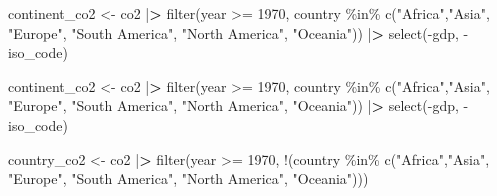 \documentclass[
]{article}
\newenvironment{Shaded}{\begin{snugshade}}{\end{snugshade}}
\newcommand{\DecValTok}[1]{\textcolor[rgb]{0.00,0.00,0.81}{#1}}
\newcommand{\ErrorTok}[1]{\textcolor[rgb]{0.64,0.00,0.00}{\textbf{#1}}}
\newcommand{\FunctionTok}[1]{\textcolor[rgb]{0.00,0.00,0.00}{#1}}
\newcommand{\NormalTok}[1]{#1}
\newcommand{\OtherTok}[1]{\textcolor[rgb]{0.56,0.35,0.01}{#1}}
\newcommand{\SpecialCharTok}[1]{\textcolor[rgb]{0.00,0.00,0.00}{#1}}
\newcommand{\StringTok}[1]{\textcolor[rgb]{0.31,0.60,0.02}{#1}}
\begin{document}
\begin{Shaded}
\begin{Highlighting}[]
\NormalTok{continent\_co2 }\OtherTok{\textless{}{-}}\NormalTok{ co2 }\SpecialCharTok{|}\ErrorTok{\textgreater{}}
  \FunctionTok{filter}\NormalTok{(year }\SpecialCharTok{\textgreater{}=} \DecValTok{1970}\NormalTok{, country }\SpecialCharTok{\%in\%} \FunctionTok{c}\NormalTok{(}\StringTok{"Africa"}\NormalTok{,}\StringTok{"Asia"}\NormalTok{, }\StringTok{"Europe"}\NormalTok{, }\StringTok{"South America"}\NormalTok{, }\StringTok{"North America"}\NormalTok{, }\StringTok{"Oceania"}\NormalTok{)) }\SpecialCharTok{|}\ErrorTok{\textgreater{}}
  \FunctionTok{select}\NormalTok{(}\SpecialCharTok{{-}}\NormalTok{gdp,}
         \SpecialCharTok{{-}}\NormalTok{iso\_code)}
\end{Highlighting}
\end{Shaded}

\begin{Shaded}
\begin{Highlighting}[]
\NormalTok{continent\_co2 }\OtherTok{\textless{}{-}}\NormalTok{ co2 }\SpecialCharTok{|}\ErrorTok{\textgreater{}}
  \FunctionTok{filter}\NormalTok{(year }\SpecialCharTok{\textgreater{}=} \DecValTok{1970}\NormalTok{, country }\SpecialCharTok{\%in\%} \FunctionTok{c}\NormalTok{(}\StringTok{"Africa"}\NormalTok{,}\StringTok{"Asia"}\NormalTok{, }\StringTok{"Europe"}\NormalTok{, }\StringTok{"South America"}\NormalTok{, }\StringTok{"North America"}\NormalTok{, }\StringTok{"Oceania"}\NormalTok{)) }\SpecialCharTok{|}\ErrorTok{\textgreater{}}
  \FunctionTok{select}\NormalTok{(}\SpecialCharTok{{-}}\NormalTok{gdp,}
         \SpecialCharTok{{-}}\NormalTok{iso\_code)}
\end{Highlighting}
\end{Shaded}

\begin{Shaded}
\begin{Highlighting}[]
\NormalTok{country\_co2 }\OtherTok{\textless{}{-}}\NormalTok{ co2 }\SpecialCharTok{|}\ErrorTok{\textgreater{}}
  \FunctionTok{filter}\NormalTok{(year }\SpecialCharTok{\textgreater{}=} \DecValTok{1970}\NormalTok{, }\SpecialCharTok{!}\NormalTok{(country }\SpecialCharTok{\%in\%} \FunctionTok{c}\NormalTok{(}\StringTok{"Africa"}\NormalTok{,}\StringTok{"Asia"}\NormalTok{, }\StringTok{"Europe"}\NormalTok{, }\StringTok{"South America"}\NormalTok{, }\StringTok{"North America"}\NormalTok{, }\StringTok{"Oceania"}\NormalTok{))) }
\end{Highlighting}
\end{Shaded}
\end{document}
